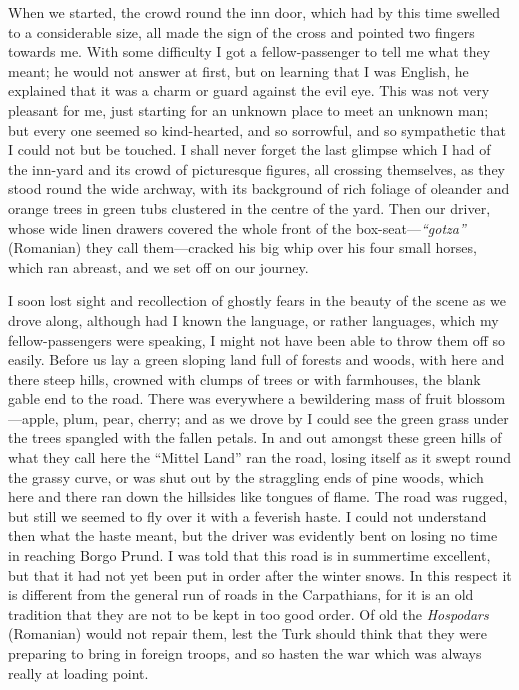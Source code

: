 \documentclass{article}
\begin{document}
				When we started, the crowd round the inn door, which had by this time swelled to a considerable size, all made the sign of the cross and pointed two fingers towards me. With some difficulty I got a fellow-passenger to tell me what they meant; he would not answer at first, but on learning that I was English, he explained that it was a charm or guard against the evil eye. This was not very pleasant for me, just starting for an unknown place to meet an unknown man; but every one seemed so kind-hearted, and so sorrowful, and so sympathetic that I could not but be touched. I shall never forget the last glimpse which I had of the inn-yard and its crowd of picturesque figures, all crossing themselves, as they stood round the wide archway, with its background of rich foliage of oleander and orange trees in green tubs clustered in the centre of the yard. Then our driver, whose wide linen drawers covered the whole front of the box-seat—\textit{“gotza”} (Romanian) they call them—cracked his big whip over his four small horses, which ran abreast, and we set off on our journey.\par\bigskip
				
				I soon lost sight and recollection of ghostly fears in the beauty of the scene as we drove along, although had I known the language, or rather languages, which my fellow-passengers were speaking, I might not have been able to throw them off so easily. Before us lay a green sloping land full of forests and woods, with here and there steep hills, crowned with clumps of trees or with farmhouses, the blank gable end to the road. There was everywhere a bewildering mass of fruit blossom—apple, plum, pear, cherry; and as we drove by I could see the green grass under the trees spangled with the fallen petals. In and out amongst these green hills of what they call here the “Mittel Land” ran the road, losing itself as it swept round the grassy curve, or was shut out by the straggling ends of pine woods, which here and there ran down the hillsides like tongues of flame. The road was rugged, but still we seemed to fly over it with a feverish haste. I could not understand then what the haste meant, but the driver was evidently bent on losing no time in reaching Borgo Prund. I was told that this road is in summertime excellent, but that it had not yet been put in order after the winter snows. In this respect it is different from the general run of roads in the Carpathians, for it is an old tradition that they are not to be kept in too good order. Of old the \textit{Hospodars} (Romanian) would not repair them, lest the Turk should think that they were preparing to bring in foreign troops, and so hasten the war which was always really at loading point.\par\bigskip
				
\end{document}
